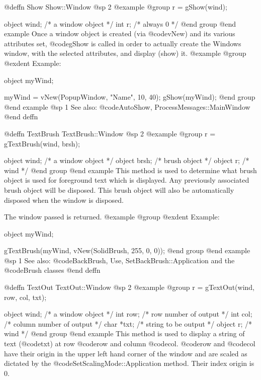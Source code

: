 @deffn {Show} Show::Window
@sp 2
@example
@group
r = gShow(wind);

object  wind;   /*  a window object     */
int     r;      /*  always 0            */
@end group
@end example
Once a window object is created (via @code{vNew}) and its various attributes
set, @code{gShow} is called in order to actually create the Windows window,
with the selected attributes, and display (show) it.
@example
@group
@exdent Example:

object  myWind;

myWind = vNew(PopupWindow, "Name", 10, 40);
gShow(myWind);
@end group
@end example
@sp 1
See also:  @code{AutoShow, ProcessMessages::MainWindow}
@end deffn









@deffn {TextBrush} TextBrush::Window
@sp 2
@example
@group
r = gTextBrush(wind, brsh);

object  wind;   /*  a window object   */
object  brsh;   /*  brush object      */
object  r;      /*  wind              */
@end group
@end example
This method is used to determine what brush object is used for foreground
text which is displayed.  Any previously associated brush object will
be disposed.  This brush object will also be automatically disposed when the
window is disposed.

The window passed is returned.
@example
@group
@exdent Example:

object  myWind;

gTextBrush(myWind, vNew(SolidBrush, 255, 0, 0));
@end group
@end example
@sp 1
See also:  @code{BackBrush, Use, SetBackBrush::Application}
        and the @code{Brush} classes
@end deffn










@deffn {TextOut} TextOut::Window
@sp 2
@example
@group
r = gTextOut(wind, row, col, txt);

object  wind;   /*  a window object          */
int     row;    /*  row number of output     */
int     col;    /*  column number of output  */
char    *txt;   /*  string to be output      */
object  r;      /*  wind                     */
@end group
@end example
This method is used to display a string of text (@code{txt}) at row
@code{row} and column @code{col}.  @code{row} and @code{col} have their
origin in the upper left hand corner of the window and are scaled as
dictated by the @code{SetScalingMode::Application} method.
Their index origin is 0.


